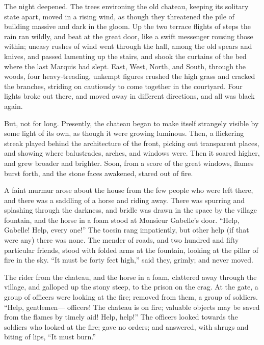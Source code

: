 The night deepened.  The trees environing the old chateau, keeping
its solitary state apart, moved in a rising wind, as though they
threatened the pile of building massive and dark in the gloom.  Up
the two terrace flights of steps the rain ran wildly, and beat at
the great door, like a swift messenger rousing those within; uneasy
rushes of wind went through the hall, among the old spears and knives,
and passed lamenting up the stairs, and shook the curtains of the bed
where the last Marquis had slept.  East, West, North, and South, through
the woods, four heavy-treading, unkempt figures crushed the high grass
and cracked the branches, striding on cautiously to come together in
the courtyard.  Four lights broke out there, and moved away in different
directions, and all was black again.

But, not for long.  Presently, the chateau began to make itself
strangely visible by some light of its own, as though it were growing
luminous.  Then, a flickering streak played behind the architecture
of the front, picking out transparent places, and showing where
balustrades, arches, and windows were.  Then it soared higher, and
grew broader and brighter.  Soon, from a score of the great windows,
flames burst forth, and the stone faces awakened, stared out of fire.

A faint murmur arose about the house from the few people who were left
there, and there was a saddling of a horse and riding away.  There was
spurring and splashing through the darkness, and bridle was drawn in
the space by the village fountain, and the horse in a foam stood at
Monsieur Gabelle's door.  ``Help, Gabelle!  Help, every one!''  The
tocsin rang impatiently, but other help (if that were any) there was
none.  The mender of roads, and two hundred and fifty particular
friends, stood with folded arms at the fountain, looking at the pillar
of fire in the sky.  ``It must be forty feet high,'' said they, grimly;
and never moved.

The rider from the chateau, and the horse in a foam, clattered away
through the village, and galloped up the stony steep, to the prison
on the crag.  At the gate, a group of officers were looking at the
fire; removed from them, a group of soldiers.  ``Help, gentlemen---%
officers!  The chateau is on fire; valuable objects may be saved from
the flames by timely aid!  Help, help!''  The officers looked towards
the soldiers who looked at the fire; gave no orders; and answered,
with shrugs and biting of lips, ``It must burn.''

